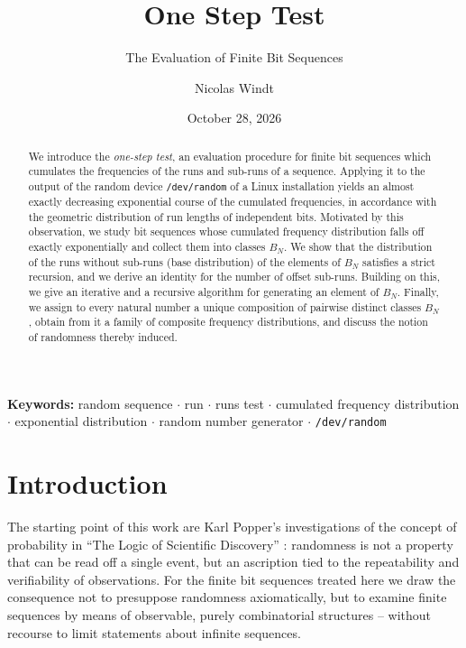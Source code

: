 \documentclass[11pt,a4paper]{scrartcl}
\title{One Step Test}
\subtitle{The Evaluation of Finite Bit Sequences}
\author{Nicolas Windt}
\date{October 28, 2026}
\theoremstyle{plain}
\theoremstyle{definition}
\theoremstyle{remark}
\begin{document}
\maketitle

\begin{abstract}
We introduce the \emph{one-step test}, an evaluation procedure for
finite bit sequences which cumulates the frequencies of the runs and
sub-runs of a sequence. Applying it to the output of the random device
\texttt{/dev/random} of a Linux installation yields an almost exactly
decreasing exponential course of the cumulated frequencies, in
accordance with the geometric distribution of run lengths of
independent bits. Motivated by this observation, we study bit
sequences whose cumulated frequency distribution falls off exactly
exponentially and collect them into classes $B_N$. We show that the
distribution of the runs without sub-runs (base distribution) of the
elements of $B_N$ satisfies a strict recursion, and we derive an
identity for the number of offset sub-runs. Building on this, we give
an iterative and a recursive algorithm for generating an element of
$B_N$. Finally, we assign to every natural number a unique
composition of pairwise distinct classes $B_N$, obtain from it a
family of composite frequency distributions, and discuss the notion of
randomness thereby induced.
\end{abstract}

\vspace{0.5em}
\noindent\textbf{Keywords:}
random sequence $\cdot$ run $\cdot$ runs test $\cdot$ cumulated
frequency distribution $\cdot$ exponential distribution $\cdot$
random number generator $\cdot$ \texttt{/dev/random}

\section{Introduction}\label{sec:einleitung}

The starting point of this work are Karl Popper's investigations of
the concept of probability in \enquote{The Logic of Scientific
Discovery} \cite{popper1935}: randomness is not a property that can be
read off a single event, but an ascription tied to the repeatability
and verifiability of observations. For the finite bit sequences
treated here we draw the consequence not to presuppose randomness
axiomatically, but to examine finite sequences by means of
observable, purely combinatorial structures -- without recourse to
limit statements about infinite sequences.
\end{document}
